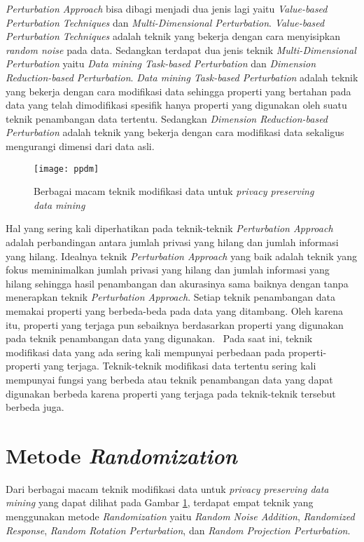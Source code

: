 \textit{Perturbation Approach} bisa dibagi menjadi dua jenis lagi yaitu \textit{Value-based Perturbation Techniques} dan \textit{Multi-Dimensional Perturbation}. \textit{Value-based Perturbation Techniques} adalah teknik yang bekerja dengan cara menyisipkan \textit{random noise} pada data. Sedangkan terdapat dua jenis teknik \textit{Multi-Dimensional Perturbation} yaitu \textit{Data mining Task-based Perturbation} dan \textit{Dimension Reduction-based Perturbation}. \textit{Data mining Task-based Perturbation} adalah teknik yang bekerja dengan cara modifikasi data sehingga properti yang bertahan pada data yang telah dimodifikasi spesifik hanya properti yang digunakan oleh suatu teknik penambangan data tertentu. Sedangkan \textit{Dimension Reduction-based Perturbation} adalah teknik yang bekerja dengan cara modifikasi data sekaligus mengurangi dimensi dari data asli.

\begin{figure}
	\centering
	\texttt{[image: ppdm]}
	\caption{Berbagai macam teknik modifikasi data untuk \textit{privacy preserving data mining}}
	\label{fig:ppdm}
\end{figure}

Hal yang sering kali diperhatikan pada teknik-teknik \textit{Perturbation Approach} adalah perbandingan antara jumlah privasi yang hilang dan jumlah informasi yang hilang. Idealnya teknik \textit{Perturbation Approach} yang baik adalah teknik yang fokus meminimalkan jumlah privasi yang hilang dan jumlah informasi yang hilang sehingga hasil penambangan dan akurasinya sama baiknya dengan tanpa menerapkan teknik \textit{Perturbation Approach}. Setiap teknik penambangan data memakai properti yang berbeda-beda pada data yang ditambang. Oleh karena itu, properti yang terjaga pun sebaiknya berdasarkan properti yang digunakan pada teknik penambangan data yang digunakan.~\cite{rotation:05:chenliu} Pada saat ini, teknik modifikasi data yang ada sering kali mempunyai perbedaan pada properti-properti yang terjaga. Teknik-teknik modifikasi data tertentu sering kali mempunyai fungsi yang berbeda atau teknik penambangan data yang dapat digunakan berbeda karena properti yang terjaga pada teknik-teknik tersebut berbeda juga.

\section{Metode \textit{Randomization}}
\label{sec:metoderandomization}

Dari berbagai macam teknik modifikasi data untuk \textit{privacy preserving data mining} yang dapat dilihat pada Gambar \ref{fig:ppdm}, terdapat empat teknik yang menggunakan metode \textit{Randomization} yaitu \textit{Random Noise Addition}, \textit{Randomized Response}, \textit{Random Rotation Perturbation}, dan \textit{Random Projection Perturbation}.

